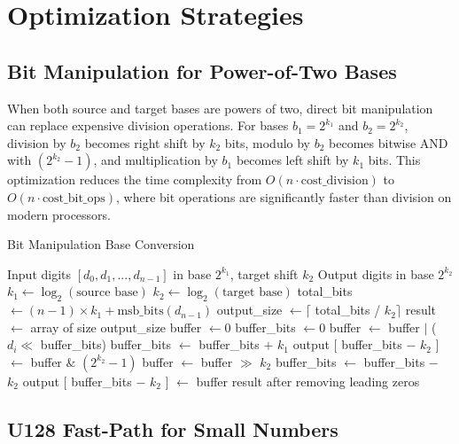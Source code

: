 \documentclass[10pt]{article}
\begin{document}
\section{Optimization Strategies}

\subsection{Bit Manipulation for Power-of-Two Bases}

When both source and target bases are powers of two, direct bit manipulation can replace expensive division operations. For bases $b_1 = 2^{k_1}$ and $b_2 = 2^{k_2}$, division by $b_2$ becomes right shift by $k_2$ bits, modulo by $b_2$ becomes bitwise AND with $(2^{k_2} - 1)$, and multiplication by $b_1$ becomes left shift by $k_1$ bits. This optimization reduces the time complexity from $O(n \cdot \text{cost\_division})$ to $O(n \cdot \text{cost\_bit\_ops})$, where bit operations are significantly faster than division on modern processors.

\begin{algorithm}
\caption{Bit Manipulation Base Conversion}
\begin{algorithmic}[1]
\REQUIRE Input digits $[d_0, d_1, ..., d_{n-1}]$ in base $2^{k_1}$, target shift $k_2$
\ENSURE Output digits in base $2^{k_2}$
\STATE $k_1 \gets \log_2(\text{source base})$
\STATE $k_2 \gets \log_2(\text{target base})$
\STATE total\_bits $\gets (n-1) \times k_1 + \text{msb\_bits}(d_{n-1})$
\STATE output\_size $\gets \lceil$ total\_bits / $k_2 \rceil$
\STATE result $\gets$ array of size output\_size
\STATE buffer $\gets 0$
\STATE buffer\_bits $\gets 0$
  \STATE buffer $\gets$ buffer $|$ ($d_i \ll$ buffer\_bits)
  \STATE buffer\_bits $\gets$ buffer\_bits $+$ $k_1$
    \STATE output $[$ buffer\_bits $-$ $k_2$ $]$ $\gets$ buffer $\&$ $(2^{k_2} - 1)$
    \STATE buffer $\gets$ buffer $\gg$ $k_2$
    \STATE buffer\_bits $\gets$ buffer\_bits $-$ $k_2$
  \ENDWHILE
\ENDFOR
{}
  \STATE output $[$ buffer\_bits $-$ $k_2$ $]$ $\gets$ buffer
\ENDIF
\RETURN result after removing leading zeros
\end{algorithmic}
\end{algorithm}

\subsection{U128 Fast-Path for Small Numbers}
\end{document}
